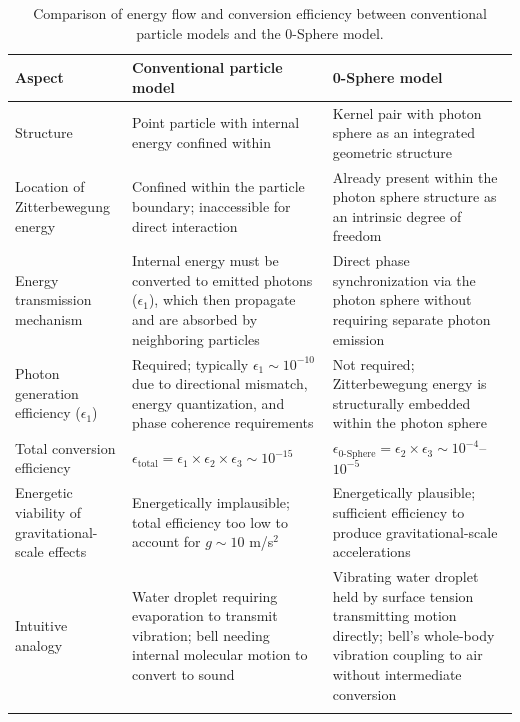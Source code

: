 \documentclass[%
 reprint,
 amsmath,amssymb,
 aps,
 prb,
]{revtex4-2}
\numberwithin{equation}{section}
\begin{document}
\begin{table}[th!]
\centering
\caption{Comparison of energy flow and conversion efficiency between conventional particle models and the 0-Sphere model.}
\label{tab:energy_flow_comparison}
\renewcommand{\arraystretch}{1.4}
\begin{tabular}{p{5.0cm}p{6.0cm}p{6.0cm}}
\toprule
\textbf{Aspect} & \textbf{Conventional particle model} & \textbf{0-Sphere model} \\
\midrule
Structure
& Point particle with internal energy confined within
& Kernel pair with photon sphere as an integrated geometric structure \\
\addlinespace[0.25cm]
Location of Zitterbewegung energy
& Confined within the particle boundary; inaccessible for direct interaction
& Already present within the photon sphere structure as an intrinsic degree of freedom \\
\addlinespace[0.25cm]
Energy transmission mechanism
& Internal energy must be converted to emitted photons ($\epsilon_1$), which then propagate and are absorbed by neighboring particles
& Direct phase synchronization via the photon sphere without requiring separate photon emission \\
\addlinespace[0.25cm]
Photon generation efficiency ($\epsilon_1$)
& Required; typically $\epsilon_1 \sim 10^{-10}$ due to directional mismatch, energy quantization, and phase coherence requirements
& Not required; Zitterbewegung energy is structurally embedded within the photon sphere \\
\addlinespace[0.25cm]
Total conversion efficiency
& $\epsilon_{\text{total}} = \epsilon_1 \times \epsilon_2 \times \epsilon_3 \sim 10^{-15}$
& $\epsilon_{\text{0-Sphere}} = \epsilon_2 \times \epsilon_3 \sim 10^{-4}$--$10^{-5}$ \\
\addlinespace[0.25cm]
Energetic viability of gravitational-scale effects
& Energetically implausible; total efficiency too low to account for $g \sim 10$ m/s$^2$
& Energetically plausible; sufficient efficiency to produce gravitational-scale accelerations \\
\addlinespace[0.25cm]
Intuitive analogy
& Water droplet requiring evaporation to transmit vibration; bell needing internal molecular motion to convert to sound
& Vibrating water droplet held by surface tension transmitting motion directly; bell's whole-body vibration coupling to air without intermediate conversion \\
\addlinespace[0.20cm]
\bottomrule
\end{tabular}
\vspace{0.4em}

\end{table}
\end{document}
